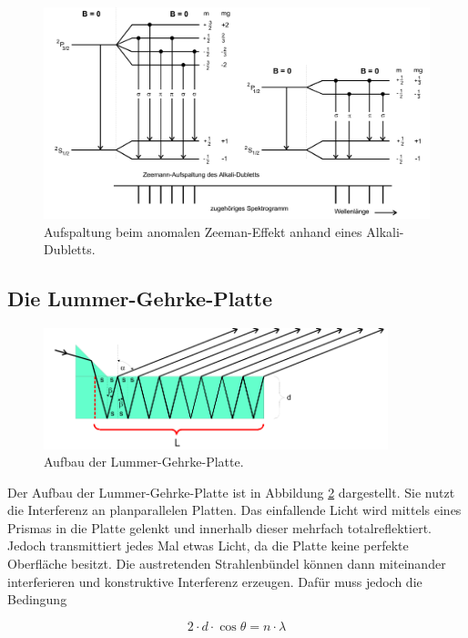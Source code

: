 \begin{figure}
  \includegraphics[width=15cm]{Pics/Alkali.png}
  \caption{Aufspaltung beim anomalen Zeeman-Effekt anhand eines Alkali-Dubletts. \cite{anleitung01}}
  \label{fig:AlkaliBeispiel}
\end{figure}

\newpage

\subsection{Die Lummer-Gehrke-Platte}

\begin{figure}
  \centering
  \includegraphics[width=10cm]{Pics/Lummer.png}
  \caption{Aufbau der Lummer-Gehrke-Platte. \cite{anleitung01}}
  \label{fig:LummerGehrke}
\end{figure}

Der Aufbau der Lummer-Gehrke-Platte ist in Abbildung \ref{fig:LummerGehrke} dargestellt.
Sie nutzt die Interferenz an planparallelen Platten. Das einfallende Licht wird
mittels eines Prismas in die Platte gelenkt und innerhalb dieser mehrfach
totalreflektiert. Jedoch transmittiert jedes Mal etwas Licht, da die Platte keine
perfekte Oberfläche besitzt. Die austretenden Strahlenbündel können dann miteinander
interferieren und konstruktive Interferenz erzeugen. Dafür muss jedoch die
Bedingung

\begin{equation}
  2 \cdot d \cdot \cos{\theta} = n \cdot \lambda
  \label{eqn:Bragg}
\end{equation}

